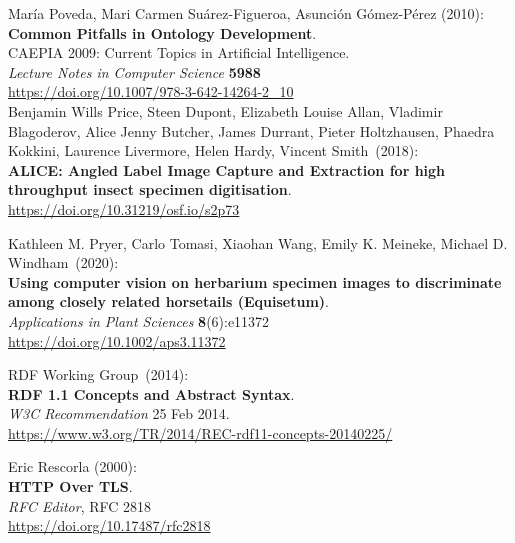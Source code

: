 \begin{thebibliography}{9}
María Poveda, Mari Carmen Suárez-Figueroa, Asunción Gómez-Pérez (2010):\\
\textbf{Common Pitfalls in Ontology Development}.\\
CAEPIA 2009: Current Topics in Artificial Intelligence.\\
\emph{Lecture Notes in Computer Science} \textbf{5988}\\
\url{https://doi.org/10.1007/978-3-642-14264-2_10}\\

Benjamin Wills Price, Steen Dupont, Elizabeth Louise Allan, Vladimir Blagoderov, Alice Jenny Butcher, James Durrant, Pieter Holtzhausen, Phaedra Kokkini, Laurence Livermore, Helen Hardy, Vincent Smith~(2018):\\
\textbf{ALICE: Angled Label Image Capture and Extraction
for high throughput insect specimen digitisation}.\\
\url{https://doi.org/10.31219/osf.io/s2p73}

Kathleen M. Pryer, Carlo Tomasi, Xiaohan Wang, Emily K. Meineke, Michael D. Windham~(2020):\\
\textbf{Using computer vision on herbarium specimen images
to discriminate among closely related horsetails (Equisetum)}.\\
\emph{Applications in Plant Sciences} \textbf{8}(6):e11372\\
\url{https://doi.org/10.1002/aps3.11372}

RDF Working Group~(2014):\\
\textbf{RDF 1.1 Concepts and Abstract Syntax}.\\
\emph{W3C Recommendation} 25 Feb 2014.\\
\url{https://www.w3.org/TR/2014/REC-rdf11-concepts-20140225/}

Eric Rescorla (2000):\\
\textbf{HTTP Over TLS}.\\
\emph{RFC Editor}, RFC 2818\\
\url{https://doi.org/10.17487/rfc2818}


\end{thebibliography}
